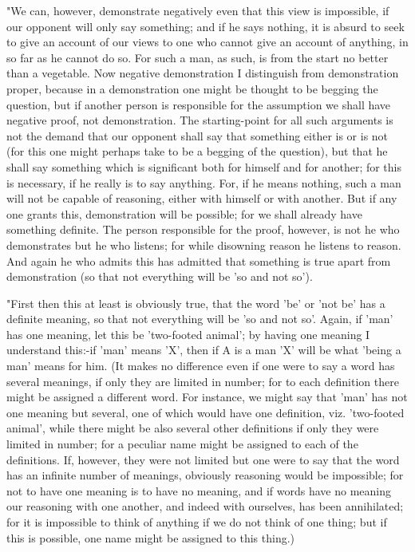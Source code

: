 "We can, however, demonstrate negatively even that this view is impossible,
if our opponent will only say something; and if he says nothing, it
is absurd to seek to give an account of our views to one who cannot
give an account of anything, in so far as he cannot do so. For such
a man, as such, is from the start no better than a vegetable. Now
negative demonstration I distinguish from demonstration proper, because
in a demonstration one might be thought to be begging the question,
but if another person is responsible for the assumption we shall have
negative proof, not demonstration. The starting-point for all such
arguments is not the demand that our opponent shall say that something
either is or is not (for this one might perhaps take to be a begging
of the question), but that he shall say something which is significant
both for himself and for another; for this is necessary, if he really
is to say anything. For, if he means nothing, such a man will not
be capable of reasoning, either with himself or with another. But
if any one grants this, demonstration will be possible; for we shall
already have something definite. The person responsible for the proof,
however, is not he who demonstrates but he who listens; for while
disowning reason he listens to reason. And again he who admits this
has admitted that something is true apart from demonstration (so that
not everything will be 'so and not so'). 

"First then this at least is obviously true, that the word 'be' or
'not be' has a definite meaning, so that not everything will be 'so
and not so'. Again, if 'man' has one meaning, let this be 'two-footed
animal'; by having one meaning I understand this:-if 'man' means 'X',
then if A is a man 'X' will be what 'being a man' means for him. (It
makes no difference even if one were to say a word has several meanings,
if only they are limited in number; for to each definition there might
be assigned a different word. For instance, we might say that 'man'
has not one meaning but several, one of which would have one definition,
viz. 'two-footed animal', while there might be also several other
definitions if only they were limited in number; for a peculiar name
might be assigned to each of the definitions. If, however, they were
not limited but one were to say that the word has an infinite number
of meanings, obviously reasoning would be impossible; for not to have
one meaning is to have no meaning, and if words have no meaning our
reasoning with one another, and indeed with ourselves, has been annihilated;
for it is impossible to think of anything if we do not think of one
thing; but if this is possible, one name might be assigned to this
thing.) 

